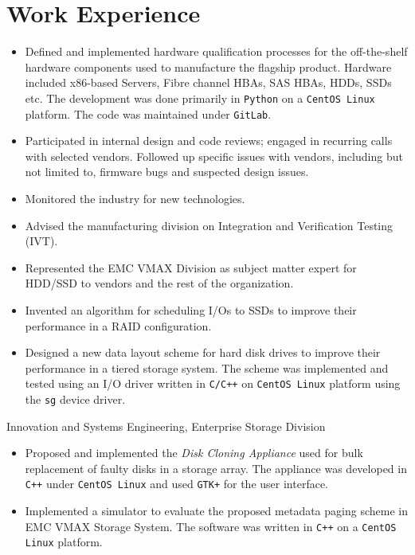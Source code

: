 \section{Work Experience}

{
	\begin{itemize}
		\item Defined and implemented hardware qualification processes for the
			off-the-shelf hardware components used to manufacture the flagship
			product. Hardware included x86-based Servers, Fibre channel HBAs,
			SAS HBAs, HDDs, SSDs etc.  The development was done primarily in \texttt{Python}
			on a \texttt{CentOS Linux} platform. The code was maintained under \texttt{GitLab}.
		\item Participated in internal design and code reviews; engaged in
			recurring calls with selected vendors. Followed up specific issues 
			with vendors, including but not limited to, firmware bugs and
			suspected design issues.
		\item  Monitored the industry for new technologies.
		\item Advised the manufacturing division on Integration and Verification Testing (IVT).
	\end{itemize}
}
{
	\begin{itemize}
		\item Represented the EMC VMAX Division as subject matter expert for HDD/SSD to vendors
			and the rest of the organization.
		\item Invented an algorithm for scheduling I/Os to SSDs to improve
			their performance in a RAID configuration.
		\item Designed a new data layout scheme for hard disk drives to improve
			their performance in a tiered storage system.
			The scheme was implemented and tested using an I/O driver written
			in \texttt{C/C++} on \texttt{CentOS Linux} platform using the \texttt{sg} device driver.
	\end{itemize}
}
{Innovation and Systems Engineering, Enterprise Storage Division}
{
	\begin{itemize}
        \item Proposed and implemented the {\em Disk Cloning Appliance} used for bulk
            replacement of faulty disks in a storage array. The appliance was
			developed in \texttt{C++} under \texttt{CentOS Linux} and used \texttt{GTK+} for the user
			interface.
		\item Implemented a simulator to evaluate the proposed metadata paging
			scheme in EMC VMAX Storage System. The software was written in
			\texttt{C++} on a \texttt{CentOS Linux} platform.
	\end{itemize}
}
